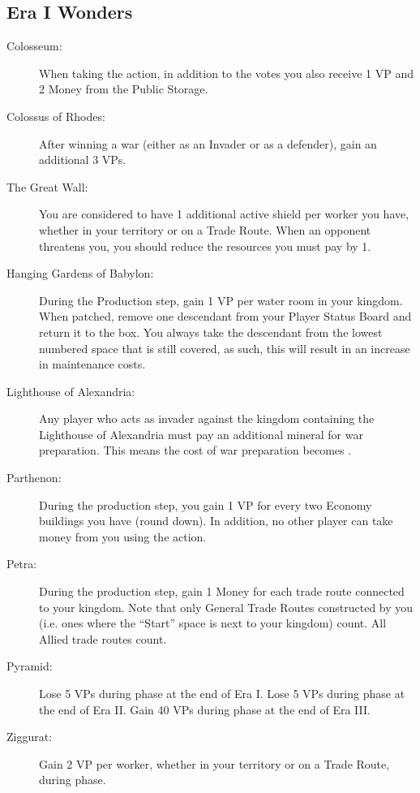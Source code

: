 \documentclass[10pt,twocolumn]{article}
\begin{document}
\begin{appendices}
\subsection{Era I Wonders}
\begin{description}
\item[Colosseum:] When taking the  action, in addition to the votes you also receive 1 VP and 2 Money from the Public Storage.
\item[Colossus of Rhodes:] After winning a war (either as an Invader or as a defender), gain an additional 3 VPs.
\item[The Great Wall:] You are considered to have 1 additional active shield per worker you have, whether in your territory or on a Trade Route. When an opponent threatens you, you should reduce the resources you must pay by 1.
\item[Hanging Gardens of Babylon:] During the Production step, gain 1 VP per water room in your kingdom. When patched, remove one descendant from your Player Status Board and return it to the box. You always take the descendant from the lowest numbered space that is still covered, as such, this will result in an increase in maintenance costs.
\item[Lighthouse of Alexandria:] Any player who acts as invader against the kingdom containing the Lighthouse of Alexandria must pay an additional mineral for war preparation. This means the cost of war preparation becomes .
\item[Parthenon:] During the production step, you gain 1 VP for every two Economy buildings you have (round down). In addition, no other player can take money from you using the  action.
\item[Petra:] During the production step, gain 1 Money for each trade route connected to your kingdom. Note that only General Trade Routes constructed by you (i.e. ones where the ``Start'' space is next to your kingdom) count. All Allied trade routes count.
\item[Pyramid:] Lose 5 VPs during  phase at the end of Era I. Lose 5 VPs during  phase at the end of Era II. Gain 40 VPs during  phase at the end of Era III.
\item[Ziggurat:] Gain 2 VP per worker, whether in your territory or on a Trade Route, during  phase.
\end{description}

\end{appendices}
\end{document}
